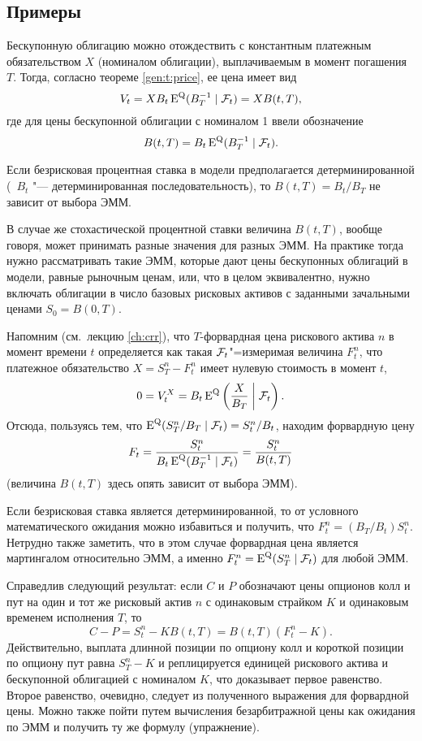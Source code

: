 \subsection{Примеры}
\begin{example}
Бескупонную облигацию можно отождествить с константным платежным обязательством $X$ (номиналом облигации), выплачиваемым в момент погашения $T$.
Тогда, согласно теореме \ref{gen:t:price}, ее цена  имеет вид
\[
V_t = XB_t \operatorname{E}^{\mathrm{Q}}(B_T^{-1} \mid \mathcal{F}_t)  = X B(t,T),
\]
где для цены бескупонной облигации с номиналом 1 ввели обозначение 
\[
B(t,T) = B_t \operatorname{E}^{\mathrm{Q}}(B_T^{-1} \mid \mathcal{F}_t).
\]

Если безрисковая процентная ставка в модели предполагается детерминированной (\te\ $B_t$ "--- детерминированная последовательность), то $B(t,T)=B_t/B_T$ не зависит от выбора ЭММ.

В случае же стохастической процентной ставки величина $B(t,T)$, вообще говоря, может принимать разные значения для разных ЭММ. На практике тогда нужно рассматривать такие ЭММ, которые дают цены бескупонных облигаций в модели, равные рыночным ценам, или, что в целом эквивалентно, нужно включать облигации в число базовых рисковых активов с заданными зачальными ценами $S_0 = B(0,T)$.
\end{example}

\begin{example}
\label{gen:e:forward}
Напомним (см.~лекцию \ref{ch:crr}), что $T$-форвардная цена рискового актива $n$ в момент времени $t$ определяется как такая $\mathcal{F}_t$"=измеримая величина $F_t^n$, что платежное обязательство $X = S_T^n - F_t^n$ имеет нулевую стоимость в момент $t$, \te\
\[
0 = V_t^X = B_t\operatorname{E}^{\mathrm{Q}}\left(\frac{X}{B_T} \;\bigg|\; \mathcal{F}_t\right).
\]
Отсюда, пользуясь тем, что $\operatorname{E}^{\mathrm{Q}}(S_T^n/B_T\mid \mathcal{F}_t) = S_t^n/B_t$, находим форвардную цену
\[
F_t = \frac{S_t^n}{B_t\operatorname{E}^{\mathrm{Q}}(B_T^{-1} \mid \mathcal{F}_t)} = \frac{S_t^n}{B(t,T)}
\]
(величина $B(t,T)$ здесь опять зависит от выбора ЭММ).

Если безрисковая ставка является детерминированной, то от условного математического ожидания можно избавиться и получить, что $F_t^n = (B_T/B_t) S_t^n$.
Нетрудно также заметить, что в этом случае форвардная цена является мартингалом относительно ЭММ, а именно $F_t^n = \operatorname{E}^{\mathrm{Q}}(S_T^n\mid \mathcal{F}_t)$ для любой ЭММ.
\end{example}

\begin{example}
Справедлив следующий результат: если $C$ и $P$ обозначают цены опционов колл и пут на один и тот же рисковый актив $n$ с одинаковым страйком $K$ и одинаковым временем исполнения $T$, то
\[
C - P = S_t^n - KB(t,T) = B(t,T)(F_t^n - K).
\]
Действительно, выплата длинной позиции по опциону колл и короткой позиции по опциону пут равна $S_T^n - K$ и реплицируется единицей рискового актива и бескупонной облигацией с номиналом $K$, что доказывает первое равенство. Второе равенство, очевидно, следует из полученного выражения для форвардной цены. 
Можно также пойти путем вычисления безарбитражной цены как ожидания по ЭММ и получить ту же формулу (упражнение).
\end{example}


